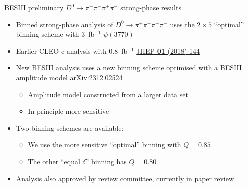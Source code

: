 \documentclass{beamer}
\begin{document}
\begin{frame}{BESIII preliminary $D^0\to\pi^+\pi^-\pi^+\pi^-$ strong-phase results}
  \vspace{0.3cm}
  \begin{itemize}
    \setlength\itemsep{1.0em}
    \item{Binned strong-phase analysis of $D^0\to\pi^+\pi^-\pi^+\pi^-$ uses the $2\times5$ ``optimal'' binning scheme with $3$~fb$^{-1}$ $\psi(3770)$}
    \item{Earlier CLEO-c analysis with $0.8$~fb$^{-1}$ \href{https://link.springer.com/article/10.1007/JHEP01(2018)144}{JHEP \textbf{01} (2018) 144}}
    \item{New BESIII analysis uses a new binning scheme optimised with a BESIII amplitude model \href{https://arxiv.org/abs/2312.02524}{arXiv:2312.02524}}
    \begin{itemize}
      \item{Amplitude model constructed from a larger data set}
      \item{In principle more sensitive}
    \end{itemize}
    \item{Two binning schemes are available:}
    \begin{itemize}
      \item{We use the more sensitive ``optimal'' binning with $Q = 0.85$}
      \item{The other ``equal $\delta$'' binning has $Q = 0.80$}
    \end{itemize}
    \item{Analysis also approved by review committee, currently in paper review}
  \end{itemize}
\end{frame}
\end{document}

